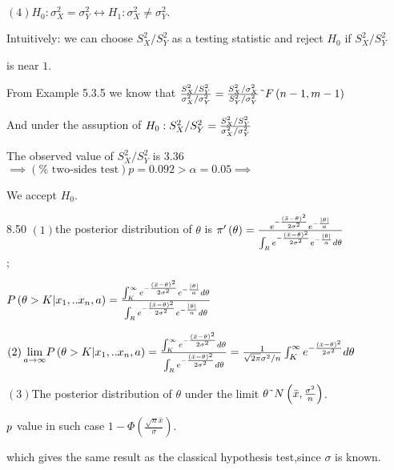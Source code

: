 \documentclass{article}
\begin{document}
$\left( 4\right) H_{0}:\sigma _{X}^{2}=\sigma _{Y}^{2}\leftrightarrow
H_{1}:\sigma _{X}^{2}\neq \sigma _{Y}^{2}.$

Intuitively: we can choose $S_{X}^{2}/S_{Y}^{2}$ as a testing statistic and
reject $H_{0}$ if $S_{X}^{2}/S_{Y}^{2}$

is near $1.$

From Example 5.3.5 we know that $\frac{S_{X}^{2}/S_{Y}^{2}}{\sigma
_{X}^{2}/\sigma _{Y}^{2}}=\frac{S_{X}^{2}/\sigma _{X}^{2}}{S_{Y}^{2}/\sigma
_{Y}^{2}}\symbol{126}F\left( n-1,m-1\right) $

And under the assuption of $H_{0}:S_{X}^{2}/S_{Y}^{2}=\frac{%
S_{X}^{2}/S_{Y}^{2}}{\sigma _{X}^{2}/\sigma _{Y}^{2}}$

The observed value of $S_{X}^{2}/S_{Y}^{2}$ is 3.36 $\implies \left( \text{%
two-sides test}\right) p=0.092>\alpha =0.05\implies $

We accept $H_{0}$.

8.50 $\left( 1\right) $the posterior distribution of $\theta $ is $\pi
^{\prime }\left( \theta \right) =\frac{e^{-\frac{\left( \bar{x}-\theta
\right) ^{2}}{2\sigma ^{2}}}e^{-\frac{\left\vert \theta \right\vert }{a}}}{%
\int_{R}e^{-\frac{\left( \bar{x}-\theta \right) ^{2}}{2\sigma ^{2}}}e^{-%
\frac{\left\vert \theta \right\vert }{a}}d\theta }$

$;$

$P\left( \theta >K|x_{1},..x_{n},a\right) =\frac{\int_{K}^{\infty }e^{-\frac{%
\left( \bar{x}-\theta \right) ^{2}}{2\sigma ^{2}}}e^{-\frac{\left\vert
\theta \right\vert }{a}}d\theta }{\int_{R}e^{-\frac{\left( \bar{x}-\theta
\right) ^{2}}{2\sigma ^{2}}}e^{-\frac{\left\vert \theta \right\vert }{a}%
}d\theta }$

$\left( 2\right) \underset{a\rightarrow \infty }{\lim }P\left( \theta
>K|x_{1},..x_{n},a\right) =\frac{\int_{K}^{\infty }e^{-\frac{\left( \bar{x}%
-\theta \right) ^{2}}{2\sigma ^{2}}}d\theta }{\int_{R}e^{-\frac{\left( \bar{x%
}-\theta \right) ^{2}}{2\sigma ^{2}}}d\theta }=\frac{1}{\sqrt{2\pi }\sigma
^{2}/n}\int_{K}^{\infty }e^{-\frac{\left( \bar{x}-\theta \right) ^{2}}{%
2\sigma ^{2}}}d\theta $

$\left( 3\right) $The posterior distribution of $\theta $ under the limit $%
\theta \symbol{126}N\left( \bar{x},\frac{\sigma ^{2}}{n}\right) $.

$\bigskip p$ value in such case $1-\Phi \left( \frac{\sqrt{n}\bar{x}}{\sigma 
}\right) .$

which gives the same result as the classical hypothesis test,since $\sigma $
is known.
\end{document}
